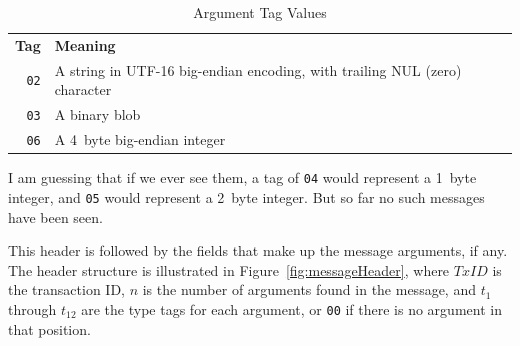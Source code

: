 \documentclass[11pt]{article}
\begin{document}
\begin{longtabu}{rX}
  \toprule
  {\bfseries Tag} & {\bfseries Meaning} \endhead

  \bottomrule \\
  \caption{Argument Tag Values} \endfoot

  {\tt 02} & A string in UTF-16 big-endian encoding, with trailing
  NUL (zero) character \label{table:argumentTags} \\

  {\tt 03} & A binary blob \\

  {\tt 06} & A 4~byte big-endian integer \\
\end{longtabu}

I am guessing that if we ever see them, a tag of {\tt 04} would
represent a 1~byte integer, and {\tt 05} would represent a 2~byte
integer. But so far no such messages have been seen.

This header is followed by the fields that make up the message
arguments, if any. The header structure is illustrated in
Figure~\ref{fig:messageHeader}, where $TxID$ is the transaction ID,
$n$ is the number of arguments found in the message, and $t_1$ through
$t_{12}$ are the type tags for each argument, or {\tt 00} if there is
no argument in that position.
\end{document}
